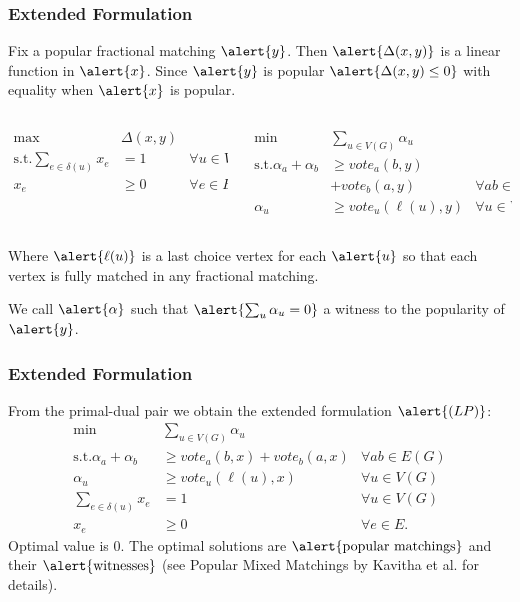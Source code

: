 \documentclass[10pt]{beamer}
\begin{document}
\begin{frame}
\frametitle{Extended Formulation}
Fix a popular fractional matching $\alert{y}$. Then $\alert{\Delta(x,y)}$ is a linear function in $\alert{x}$. Since $\alert{y}$ is popular $\alert{\Delta(x,y) \leq 0}$ with equality when $\alert{x}$ is popular.
\begin{columns}[T]
\begin{column}{.48\textwidth}
\begin{align*}
\max &\Delta(x,y) \\
\text{s.t.} \sum_{e \in \delta(u)} x_e &= 1 &\forall u \in V(G) \\
x_e &\geq 0 &\forall e \in E
\end{align*}
\end{column}
\begin{column}{.48\textwidth}
\begin{align*}
\min &\sum_{u \in V(G)} \alpha_u  \\
\text{s.t.} \alpha_a + \alpha_b &\geq vote_a(b,y) \\&+ vote_b(a,y) &\forall ab \in E(G) \\
\alpha_u &\geq vote_u(\ell(u), y) &\forall u \in V(G).
\end{align*}
\end{column}
\end{columns}
Where $\alert{\ell(u)}$ is a last choice vertex for each $\alert{u}$ so that each vertex is fully matched in any fractional matching.

We call $\alert{\alpha}$ such that $\alert{\sum_{u} \alpha_u = 0}$ a witness to the popularity of $\alert{y}$.
\end{frame}

\begin{frame}
\frametitle{Extended Formulation}
From the primal-dual pair we obtain the extended formulation $\alert{(LP)}$:
\begin{align*}
\min &\sum_{u \in V(G)} \alpha_u \\
\text{s.t.} \alpha_a + \alpha_b &\geq vote_a(b,x) + vote_b(a,x) &\forall ab \in E(G) \\
\alpha_u &\geq vote_u(\ell(u),x) &\forall u \in V(G) \\
\sum_{e \in \delta(u)} x_e &=1 &\forall u \in V(G) \\
x_e &\geq 0 &\forall e \in E.
\end{align*}
Optimal value is $0$. The optimal solutions are $\text{\alert{popular matchings}}$ and their $\text{\alert{witnesses}}$ (see Popular Mixed Matchings by Kavitha et al. for details).
\end{frame}
\end{document}
